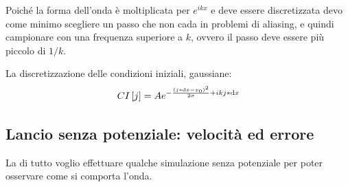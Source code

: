 Poich\'e la forma dell'onda \`e moltiplicata per $e^{ikx}$ e deve essere discretizzata devo come minimo scegliere un passo che non cada in problemi di aliasing, e quindi campionare con una frequenza superiore a $k$, ovvero il passo deve essere pi\`u piccolo di $1/k$.

La discretizzazione delle condizioni iniziali, gaussiane:
\begin{equation}
  CI\left[ j \right]= Ae^{-\frac{\left( j*\mathrm{d} x-x_0 \right)^2}{2\sigma}+i k j*\mathrm{d} x}
\end{equation}

\subsection{Lancio senza potenziale: velocit\`a ed errore}\label{sec:errore}
La di tutto voglio effettuare qualche simulazione senza potenziale per poter osservare come si comporta l'onda.

